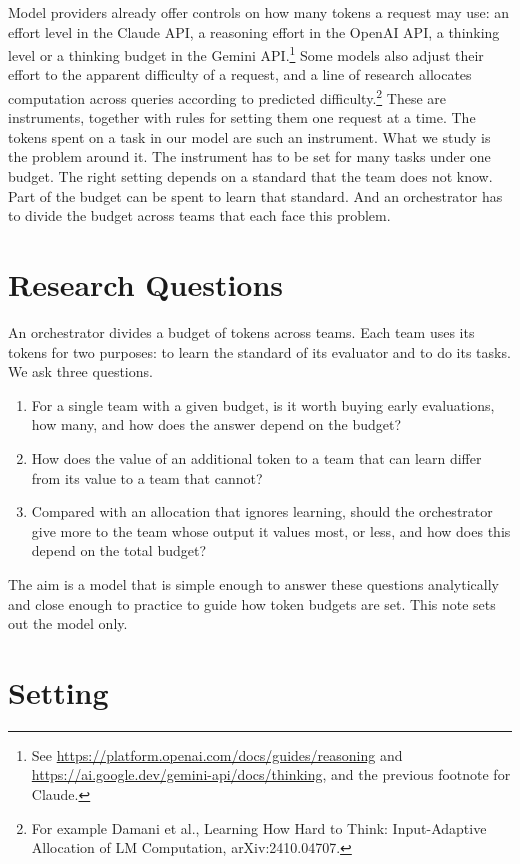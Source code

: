 \documentclass[11pt]{article}
\begin{document}
Model providers already offer controls on how many tokens a request may use: an effort level in the Claude API, a reasoning effort in the OpenAI API, a thinking level or a thinking budget in the Gemini API.\footnote{See \url{https://platform.openai.com/docs/guides/reasoning} and \url{https://ai.google.dev/gemini-api/docs/thinking}, and the previous footnote for Claude.} Some models also adjust their effort to the apparent difficulty of a request, and a line of research allocates computation across queries according to predicted difficulty.\footnote{For example Damani et al., Learning How Hard to Think: Input-Adaptive Allocation of LM Computation, arXiv:2410.04707.} These are instruments, together with rules for setting them one request at a time. The tokens spent on a task in our model are such an instrument. What we study is the problem around it. The instrument has to be set for many tasks under one budget. The right setting depends on a standard that the team does not know. Part of the budget can be spent to learn that standard. And an orchestrator has to divide the budget across teams that each face this problem.

\section{Research Questions}

An orchestrator divides a budget of tokens across teams. Each team uses its tokens for two purposes: to learn the standard of its evaluator and to do its tasks. We ask three questions.
\begin{enumerate}
\item For a single team with a given budget, is it worth buying early evaluations, how many, and how does the answer depend on the budget?
\item How does the value of an additional token to a team that can learn differ from its value to a team that cannot?
\item Compared with an allocation that ignores learning, should the orchestrator give more to the team whose output it values most, or less, and how does this depend on the total budget?
\end{enumerate}
The aim is a model that is simple enough to answer these questions analytically and close enough to practice to guide how token budgets are set. This note sets out the model only.

\section{Setting}
\end{document}
